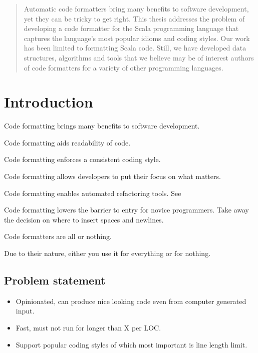 \documentclass[11pt,a4paper]{article}
\begin{document}



\begin{abstract}
  Automatic code formatters bring many benefits to software development, yet they can be tricky to get right.
  This thesis addresses the problem of developing a code formatter for the
  Scala programming language that captures the language's most popular idioms
  and coding styles.
  Our work has been limited to formatting Scala code.
  Still, we have developed data structures, algorithms and tools that we believe may be of interest authors of code formatters for a variety of other programming languages.
\end{abstract}
\tableofcontents

\section{Introduction} %
\label{sec:Introduction}
%
Code formatting brings many benefits to software development.

Code formatting aids readability of code.

Code formatting enforces a consistent coding style.

Code formatting allows developers to put their focus on what matters.

Code formatting enables automated refactoring tools.
See~\autocite{wright_large-scale_2013}

Code formatting lowers the barrier to entry for novice programmers.
Take away the decision on where to insert spaces and newlines.

Code formatters are all or nothing.

Due to their nature, either you use it for everything or for nothing.

\subsection{Problem statement}
\begin{itemize}
  \item Opinionated, can produce nice looking code even from computer generated input.
  \item Fast, must not run for longer than X per LOC.
  \item Support popular coding styles of which most important is line length limit.
\end{itemize}
\end{document}
